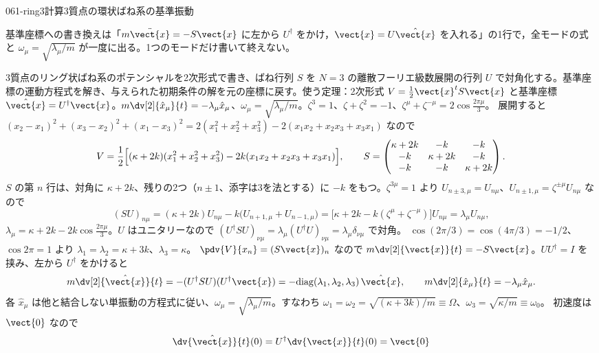 \documentclass[uplatex,dvipdfmx,a4paper,11pt]{jsarticle}
\begin{document}
\begin{mondai}{061-ring3}{計算}{3質点の環状ばね系の基準振動}
\begin{kizuki}
\item 基準座標への書き換えは「$m\ddot{\vect{x}}=-S\vect{x}$ に左から $U^{\dagger}$ をかけ，$\vect{x}=U\hat{\vect{x}}$ を入れる」の1行で，全モードの式と $\omega_{\mu}=\sqrt{\lambda_{\mu}/m}$ が一度に出る。1つのモードだけ書いて終えない。
\end{kizuki}
\begin{tadashii}
\houshin 3質点のリング状ばね系のポテンシャルを2次形式で書き、ばね行列 $S$ を $N=3$ の離散フーリエ級数展開の行列 $U$ で対角化する。基準座標の運動方程式を解き、与えられた初期条件の解を元の座標に戻す。使う定理：2次形式 $V=\frac{1}{2}\vect{x}^{t}S\vect{x}$ と基準座標 $\hat{\vect{x}}=U^{\dagger}\vect{x}$。$m\dv[2]{\hat{x}_{\mu}}{t}=-\lambda_{\mu}\hat{x}_{\mu}$、$\omega_{\mu}=\sqrt{\lambda_{\mu}/m}$。$\zeta^{3}=1$、$\zeta+\zeta^{2}=-1$、$\zeta^{\mu}+\zeta^{-\mu}=2\cos\frac{2\pi\mu}{3}$。 %
\keisan
{} 展開すると $(x_2-x_1)^{2}+(x_3-x_2)^{2}+(x_1-x_3)^{2}=2(x_1^{2}+x_2^{2}+x_3^{2})-2(x_1x_2+x_2x_3+x_3x_1)$ なので
\[
V=\frac{1}{2}\Bigl[(\kappa+2k)(x_1^{2}+x_2^{2}+x_3^{2})-2k(x_1x_2+x_2x_3+x_3x_1)\Bigr],\qquad
S=\begin{pmatrix}\kappa+2k&-k&-k\\-k&\kappa+2k&-k\\-k&-k&\kappa+2k\end{pmatrix}.
\]
 $S$ の第 $n$ 行は、対角に $\kappa+2k$、残りの2つ（$n\pm1$、添字は3を法とする）に $-k$ をもつ。$\zeta^{3\mu}=1$ より $U_{n\pm3,\mu}=U_{n\mu}$、$U_{n\pm1,\mu}=\zeta^{\pm\mu}U_{n\mu}$ なので
\[
(SU)_{n\mu}=(\kappa+2k)U_{n\mu}-k\bigl(U_{n+1,\mu}+U_{n-1,\mu}\bigr)=\bigl[\kappa+2k-k(\zeta^{\mu}+\zeta^{-\mu})\bigr]U_{n\mu}=\lambda_{\mu}U_{n\mu},
\]
$\lambda_{\mu}=\kappa+2k-2k\cos\frac{2\pi\mu}{3}$。$U$ はユニタリーなので $(U^{\dagger}SU)_{\nu\mu}=\lambda_{\mu}(U^{\dagger}U)_{\nu\mu}=\lambda_{\mu}\delta_{\nu\mu}$ で対角。
$\cos(2\pi/3)=\cos(4\pi/3)=-1/2$、$\cos2\pi=1$ より $\lambda_1=\lambda_2=\kappa+3k$、$\lambda_3=\kappa$。
 $\pdv{V}{x_n}=(S\vect{x})_n$ なので $m\dv[2]{\vect{x}}{t}=-S\vect{x}$。$UU^{\dagger}=I$ を挟み、左から $U^{\dagger}$ をかけると
\[
m\dv[2]{\hat{\vect{x}}}{t}=-(U^{\dagger}SU)(U^{\dagger}\vect{x})=-\mathrm{diag}(\lambda_1,\lambda_2,\lambda_3)\,\hat{\vect{x}},\qquad m\dv[2]{\hat{x}_{\mu}}{t}=-\lambda_{\mu}\hat{x}_{\mu}.
\]
各 $\hat{x}_{\mu}$ は他と結合しない単振動の方程式に従い、$\omega_{\mu}=\sqrt{\lambda_{\mu}/m}$。すなわち $\omega_1=\omega_2=\sqrt{(\kappa+3k)/m}\equiv\Omega$、$\omega_3=\sqrt{\kappa/m}\equiv\omega_0$。
 初速度は $\vect{0}$ なので
\[
\dv{\hat{\vect{x}}}{t}(0)=U^{\dagger}\dv{\vect{x}}{t}(0)=\vect{0}
\]
\end{tadashii}
\end{mondai}
\end{document}

